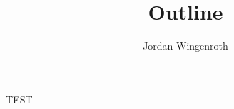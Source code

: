 \documentclass[10pt,a4paper]{article}
\author{Jordan Wingenroth}
\title{Outline}
\begin{document}
TEST
\end{document}

